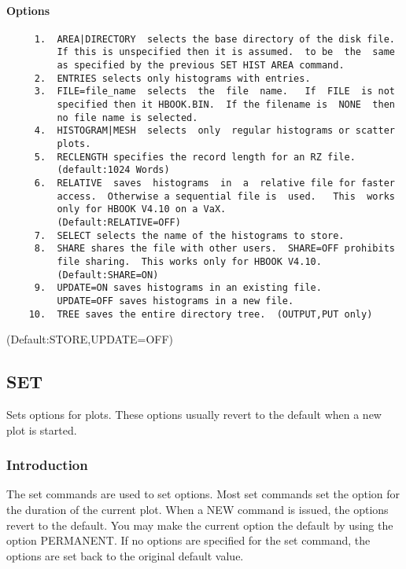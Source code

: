 \paragraph{Options}
\begin{verbatim}
     1.  AREA|DIRECTORY  selects the base directory of the disk file.
         If this is unspecified then it is assumed.  to be  the  same
         as specified by the previous SET HIST AREA command.  
     2.  ENTRIES selects only histograms with entries.  
     3.  FILE=file_name  selects  the  file  name.   If  FILE  is not
         specified then it HBOOK.BIN.  If the filename is  NONE  then
         no file name is selected.  
     4.  HISTOGRAM|MESH  selects  only  regular histograms or scatter
         plots.  
     5.  RECLENGTH specifies the record length for an RZ file.  
         (default:1024 Words) 
     6.  RELATIVE  saves  histograms  in  a  relative file for faster
         access.  Otherwise a sequential file is  used.   This  works
         only for HBOOK V4.10 on a VaX.  
         (Default:RELATIVE=OFF) 
     7.  SELECT selects the name of the histograms to store.  
     8.  SHARE shares the file with other users.  SHARE=OFF prohibits
         file sharing.  This works only for HBOOK V4.10.  
         (Default:SHARE=ON) 
     9.  UPDATE=ON saves histograms in an existing file.  
         UPDATE=OFF saves histograms in a new file.  
    10.  TREE saves the entire directory tree.  (OUTPUT,PUT only) 
\end{verbatim}
(Default:STORE,UPDATE=OFF) 
\subsection{SET}
Sets options for plots.  These options usually revert to the default when
a new plot is started.  
\subsubsection{Introduction}
The  set  commands  are used to set options.  Most set commands set the
option for the duration of the current plot.  When  a  NEW  command  is
issued,  the  options  revert to the default.  You may make the current
option the default by using the option PERMANENT.  If  no  options  are
specified for the set command, the options are set back to the original
default value.  

